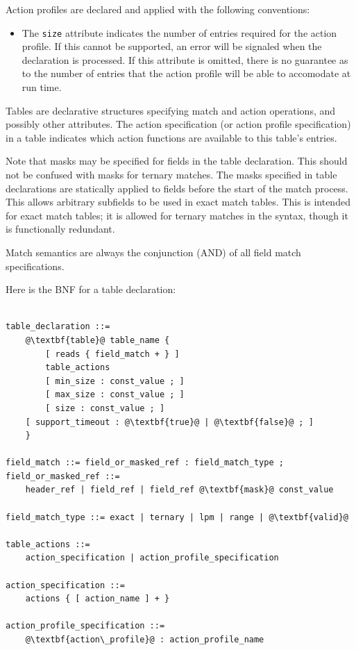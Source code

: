\documentclass[12pt]{article}
\begin{document}
Action profiles are declared and applied with the following conventions:

\begin{itemize}
\item
The \texttt{size} attribute indicates the number of entries required for the
action profile. If this cannot be supported, an error will be signaled when the
declaration is processed. If this attribute is omitted, there is no guarantee as
to the number of entries that the action profile will be able to accomodate at
run time.
\end{itemize}



Tables are declarative structures specifying match and action operations, and
possibly other attributes. The action specification (or action profile
specification) in a table indicates which action functions are available to this
table's entries.

Note that masks may be specified for fields in the table declaration. This 
should not be confused with masks for ternary matches. The masks specified 
in table declarations are statically applied to fields before the start of 
the match process. This allows arbitrary subfields to be used in exact match 
tables. This is intended for exact match tables; it is allowed for ternary 
matches in the syntax, though it is functionally redundant.

Match semantics are always the conjunction (AND) of all field match specifications.

Here is the BNF for a table declaration:

\begin{lstlisting}[frame=single,backgroundcolor=\color{bnfgreen},escapechar=\@]

table_declaration ::=
    @\textbf{table}@ table_name {
        [ reads { field_match + } ]
        table_actions
        [ min_size : const_value ; ]
        [ max_size : const_value ; ]
        [ size : const_value ; ]
	[ support_timeout : @\textbf{true}@ | @\textbf{false}@ ; ]
    }

field_match ::= field_or_masked_ref : field_match_type ;
field_or_masked_ref ::= 
    header_ref | field_ref | field_ref @\textbf{mask}@ const_value

field_match_type ::= exact | ternary | lpm | range | @\textbf{valid}@

table_actions ::= 
    action_specification | action_profile_specification

action_specification ::= 
    actions { [ action_name ] + }

action_profile_specification ::= 
    @\textbf{action\_profile}@ : action_profile_name

\end{lstlisting}
\end{document}
